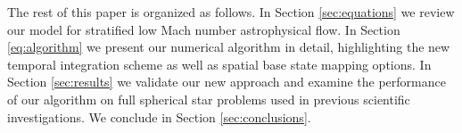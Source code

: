 The rest of this paper is organized as follows.
In Section \ref{sec:equations} we review our model for stratified low Mach number astrophysical flow.
In Section \ref{eq:algorithm} we present our numerical algorithm in detail, highlighting the new temporal integration scheme as well as spatial base state mapping options.
In Section \ref{sec:results} we validate our new approach and examine the performance of our algorithm on full spherical star problems used in previous scientific investigations.
We conclude in Section \ref{sec:conclusions}.

